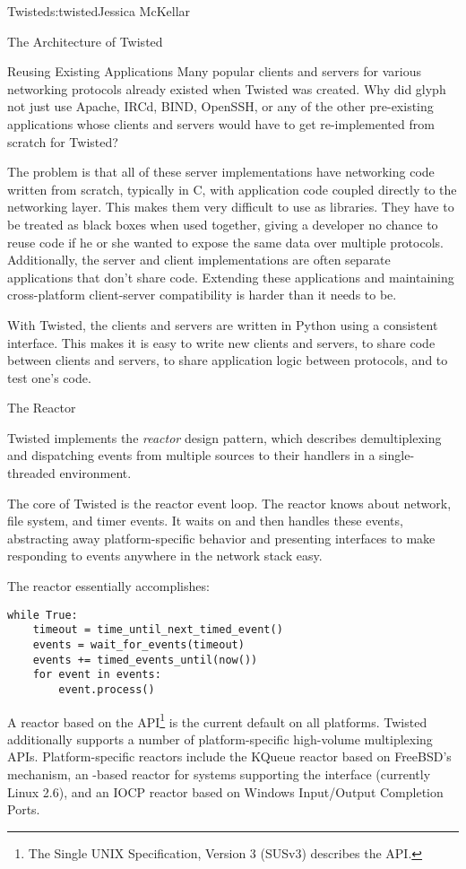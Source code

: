 \begin{aosachapter}{Twisted}{s:twisted}{Jessica McKellar}
\begin{aosasect1}{The Architecture of Twisted}
\begin{aosasect2}{Reusing Existing Applications}
Many popular clients and servers for various networking protocols already
existed when Twisted was created. Why did glyph not just use Apache, IRCd, BIND,
OpenSSH, or any of the other pre-existing applications whose clients and servers
would have to get re-implemented from scratch for Twisted?

The problem is that all of these server implementations have networking code
written from scratch, typically in C, with application code coupled directly to
the networking layer. This makes them very difficult to use as libraries. 
They have to be treated as black boxes when used together, giving a developer no
chance to reuse code if he or she wanted to expose the same data over multiple
protocols. Additionally, the server and client implementations are often
separate applications that don't share code. Extending these applications and
maintaining cross-platform client-server compatibility is harder than it needs
to be.

With Twisted, the clients and servers are written in Python using a
consistent interface. This makes it is easy to write new clients and servers, to
share code between clients and servers, to share application logic between
protocols, and to test one's code.

\end{aosasect2}

\begin{aosasect2}{The Reactor}

Twisted implements the \emph{reactor} design pattern, which describes demultiplexing
and dispatching events from multiple sources to their handlers in a
single-threaded environment.

The core of Twisted is the reactor event loop. The reactor knows about network,
file system, and timer events. It waits on and then handles these events,
abstracting away platform-specific behavior and presenting interfaces to make
responding to events anywhere in the network stack easy.

The reactor essentially accomplishes:

\begin{verbatim}
while True:
    timeout = time_until_next_timed_event()
    events = wait_for_events(timeout)
    events += timed_events_until(now())
    for event in events:
        event.process()
\end{verbatim}

A reactor based on the  API\footnote{The Single UNIX
  Specification, Version 3 (SUSv3) describes the  API.} is
the current default on all platforms. Twisted additionally supports a
number of platform-specific high-volume multiplexing
APIs. Platform-specific reactors include the KQueue reactor based on
FreeBSD's  mechanism, an -based reactor for
systems supporting the  interface (currently Linux 2.6),
and an IOCP reactor based on Windows Input/Output Completion Ports.


\end{aosasect2}
\end{aosasect1}
\end{aosachapter}
